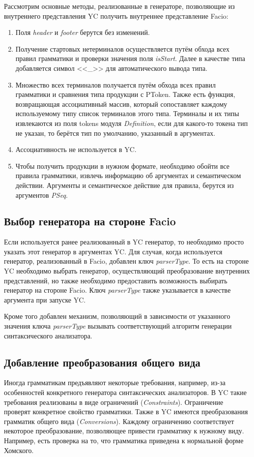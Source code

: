 \documentclass[14pt]{matmex-diploma}
\begin{document}
Рассмотрим основные методы, реализованные в генераторе, позволяющие из внутреннего представления YC получить внутреннее представление Facio:
\begin{enumerate}
\item
Поля \textit{header} и \textit{footer} берутся без изменений.
\item
Получение стартовых нетерминалов осуществляется путём обхода всех правил грамматики и проверки значения поля \textit{isStart}. Далее в качестве типа добавляется символ <<\_>> для автоматического вывода типа.
\item
Множество всех терминалов получается путём обхода всех правил грамматики и сравнения типа продукции с PToken. Также есть функция, возвращающая ассоциативный массив, который сопоставляет каждому используемому типу список терминалов этого типа. Терминалы и их типы извлекаются из поля tokens модуля \textit{Definition}, если для какого-то токена тип не указан, то берётся тип по умолчанию, указанный в аргументах.
\item
Ассоциативность не используется в YC.
\item
Чтобы получить продукции в нужном формате, необходимо обойти все правила грамматики, извлечь информацию об аргументах и семантическом действии.
Аргументы и семантическое действие для правила, берутся из аргументов \textit{PSeq}.
\end{enumerate}


\subsection{Выбор генератора на стороне Facio}
Если используется ранее реализованный в YC генератор, то необходимо просто указать этот генератор в аргументах YC. Для случая, когда используется генератор, реализованный в Facio, добавлен ключ \textit{parserType}. То есть на стороне YC необходимо выбрать генератор, осуществляющий преобразование внутренних представлений, но также необходимо предоставить возможность выбирать генератор на стороне Facio. Ключ \textit{parserType} также указывается в качестве аргумента при запуске YC.

Кроме того добавлен механизм, позволяющий в зависимости от указанного значения ключа \textit{parserType} вызывать соответствующий алгоритм генерации синтаксического анализатора.

\subsection{Добавление преобразования общего вида}
Иногда грамматикам предъявляют некоторые требования, например, из-за особенностей конкретного генератора синтаксических анализаторов. В YC такие требования реализованы в виде ограничений (\textit{Constraints}). Ограничение проверят конкретное свойство грамматики. Также в YC имеются преобразования грамматик общего вида (\textit{Conversions}). Каждому ограничению соответствует некоторое преобразование, позволяющее привести грамматику к нужному виду. Например, есть проверка на то, что грамматика приведена к нормальной форме Хомского.
\end{document}
